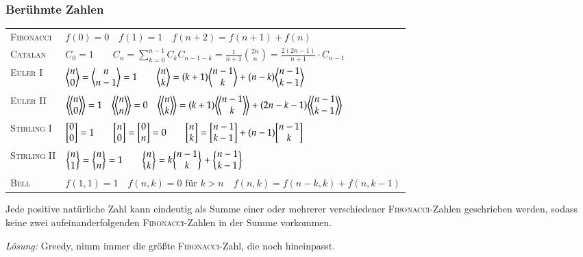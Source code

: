 \subsubsection{Berühmte Zahlen}
\begin{tabular}{|l|l|}
	\hline
	\textsc{Fibonacci}	&
	$f(0) = 0 \quad
	f(1) = 1 \quad
	f(n+2) = f(n+1) + f(n)$ \\

	\textsc{Catalan}	&
	$C_0 = 1 \qquad
	C_n = \sum\limits_{k = 0}^{n - 1} C_kC_{n - 1 - k} =
	\frac{1}{n + 1}\binom{2n}{n} = \frac{2(2n - 1)}{n+1} \cdot C_{n-1}$ \\

	\textsc{Euler} I &
	$\biggl\langle \begin{matrix} n \\ 0 \end{matrix} \biggr\rangle = \biggl\langle \begin{matrix} n \\ n-1 \end{matrix} \biggr\rangle = 1 \qquad
	\biggl\langle \begin{matrix} n \\ k \end{matrix} \biggr\rangle = (k+1) \biggl\langle \begin{matrix} n-1 \\ k \end{matrix} \biggr\rangle + (n-k) \biggl\langle \begin{matrix} n-1 \\ k-1 \end{matrix} \biggr\rangle $ \\

	\textsc{Euler} II &
	$\eulerII{n}{0} = 1 \quad
	\eulerII{n}{n} = 0 \quad
	\eulerII{n}{k} = (k+1) \eulerII{n-1}{k} + (2n-k-1) \eulerII{n-1}{k-1}$ \\

	\textsc{Stirling} I &
	$\biggl[ \begin{matrix} 0 \\ 0 \end{matrix} \biggr] = 1 \qquad
	\biggl[ \begin{matrix} n \\ 0 \end{matrix} \biggr] = \biggl[ \begin{matrix} 0 \\ n \end{matrix} \biggr] = 0 \qquad
	\biggl[ \begin{matrix} n \\ k \end{matrix} \biggr] = \biggl[ \begin{matrix} n-1 \\ k-1 \end{matrix} \biggr] + (n-1) \biggl[ \begin{matrix} n-1 \\ k \end{matrix} \biggr]$ \\

	\textsc{Stirling} II &
	$\biggl\{ \begin{matrix} n \\ 1 \end{matrix} \biggr\} = \biggl\{ \begin{matrix} n \\ n \end{matrix} \biggr\} = 1 \qquad
	\biggl\{ \begin{matrix} n \\ k \end{matrix} \biggr\} = k \biggl\{ \begin{matrix} n-1 \\ k \end{matrix} \biggr\} + \biggl\{ \begin{matrix} n-1 \\ k-1 \end{matrix} \biggr\}$ \\

	\textsc{Bell} &
	$f(1,1) = 1 \quad
	f(n,k) = 0 \text{ für } k > n \quad
	f(n,k) = f(n-k,k) + f(n,k-1)$ \\
	\hline
\end{tabular}

\begin{bem}
	Jede positive natürliche Zahl kann eindeutig als Summe einer oder mehrerer
	verschiedener \textsc{Fibonacci}-Zahlen geschrieben werden, sodass keine zwei
	aufeinanderfolgenden \textsc{Fibonacci}-Zahlen in der Summe vorkommen.

	\emph{Lösung:} Greedy, nimm immer die größte \textsc{Fibonacci}-Zahl, die noch
	hineinpasst.
\end{bem}

